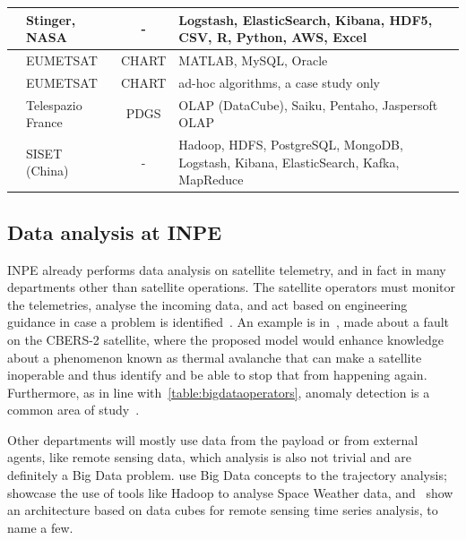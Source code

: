 \begin{table}[H]
\begin{center}
\begin{tabular}{|C{11em}|C{6em}|c|C{10em}|}
      \hline
      \cite{mateikUsingBigData2017}                  & Stinger, NASA      & -                    & Logstash, ElasticSearch, Kibana, HDF5, CSV, R, Python, AWS, Excel                    \\
      \hline
      \cite{schulsterCHARTingFutureOffline2018}      & EUMETSAT           & CHART                & MATLAB, MySQL, Oracle                                                                \\
      \hline
      \cite{trollopeAnalysisAutomatedTechniques2018} & EUMETSAT           & CHART                & ad-hoc algorithms, a case study only \\
      \hline
      \cite{yvernesCopernicusGroundSegment2018}      & Telespazio France  & PDGS                 & OLAP (DataCube), Saiku, Pentaho, Jaspersoft OLAP                                     \\
      \hline
      \cite{zhangBigDataFramework2017}               & SISET (China)      & -                    & Hadoop, HDFS, PostgreSQL, MongoDB, Logstash, Kibana, ElasticSearch, Kafka, MapReduce \\
      \hline
    \end{tabular}
  \end{center}
\end{table}

\subsection{Data analysis at INPE}\label{ch:corr:inpe}

INPE already performs data analysis on satellite telemetry, and in fact in many departments other than satellite operations.
The satellite operators must monitor the telemetries, analyse the incoming data, and act based on engineering guidance in case a problem is identified~\cite{TominagaFerrAmbr:2017:CoSaTe}.
An example is in~, made about a fault on the CBERS-2 satellite, where the proposed model would enhance knowledge about a phenomenon known as thermal avalanche that can make a satellite inoperable and thus identify and be able to stop that from happening again.
Furthermore, as in line with~\autoref{table:bigdataoperators}, anomaly detection is a common area of study~\cite{AzevedoAmbrViei::EsSoTe}.

Other departments will mostly use data from the payload or from external agents, like remote sensing data, which analysis is also not trivial and are definitely a Big Data problem.
 use Big Data concepts to the trajectory analysis;~ showcase the use of tools like Hadoop to analyse Space Weather data, and~ show an architecture based on data cubes for remote sensing time series analysis, to name a few.

